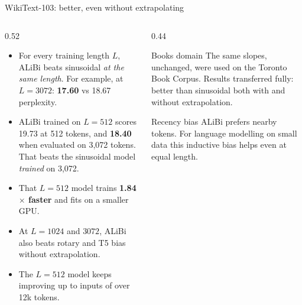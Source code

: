 \documentclass[aspectratio=169,11pt]{beamer}
\begin{document}
\begin{frame}{WikiText-103: better, even without extrapolating}
  \begin{columns}[T]
    \begin{column}{0.52\textwidth}
      \small
      \begin{itemize}
        \item For every training length $L$, ALiBi beats sinusoidal \emph{at the same length}. For example, at $L=3072$: \textbf{17.60} vs 18.67 perplexity.
        \item ALiBi trained on $L=512$ scores 19.73 at 512 tokens, and \textbf{18.40} when evaluated on 3,072 tokens. That beats the sinusoidal model \emph{trained} on 3,072.
        \item That $L=512$ model trains \textbf{1.84$\times$ faster} and fits on a smaller GPU.
        \item At $L=1024$ and $3072$, ALiBi also beats rotary and T5 bias without extrapolation.
        \item The $L=512$ model keeps improving up to inputs of over 12k tokens.
      \end{itemize}
    \end{column}
    \begin{column}{0.44\textwidth}
      \begin{exampleblock}{Books domain}
        \small
        The same slopes, unchanged, were used on the Toronto Book Corpus. Results transferred fully: better than sinusoidal both with and without extrapolation.
      \end{exampleblock}
      \begin{block}{Recency bias}
        \small
        ALiBi prefers nearby tokens. For language modelling on small data this inductive bias helps even at equal length.
      \end{block}
    \end{column}
  \end{columns}
\end{frame}
\end{document}
